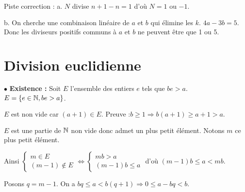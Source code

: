 \documentclass[10pt,a4paper]{article}
\begin{document}
Piste correction :
a. $N$ divise $n+1-n=1$ d'où $N=1$ ou $-1$.

b. On cherche une combinaison linéaire de $a$ et $b$ qui élimine les $k$. $4a-3b=5$. Donc les diviseurs positifs communs à $a$ et $b$ ne peuvent être que 1 ou 5.


\section{Division euclidienne}




\dem

$\bullet$ \textbf{Existence : } Soit $E$ l'ensemble des entiers $e$ tels que $be >a$. $E=\{e \in \mathbb{N} , be >a\}$.

$E$ est non vide car $(a+1)\in E$. Preuve :$b \geq 1 \Rightarrow b(a+1) \geq a+1 >a$.

$E$  est une partie de $\mathbb{N}$ non vide donc admet un plus petit élément. Notons $m$ ce plus petit élément.

Ainsi $\left\lbrace \begin{array}{l} m \in E \\ (m-1) \notin E \end{array} \right. \iff \left\lbrace \begin{array}{l}  mb>a\\(m-1)b \leq a \end{array} \right.$ d'où $(m-1)b \leq a < mb$. 

Posons $q=m-1$. On a $bq \leq a < b(q+1)\Rightarrow 0 \leq a -bq < b$.
\end{document}
